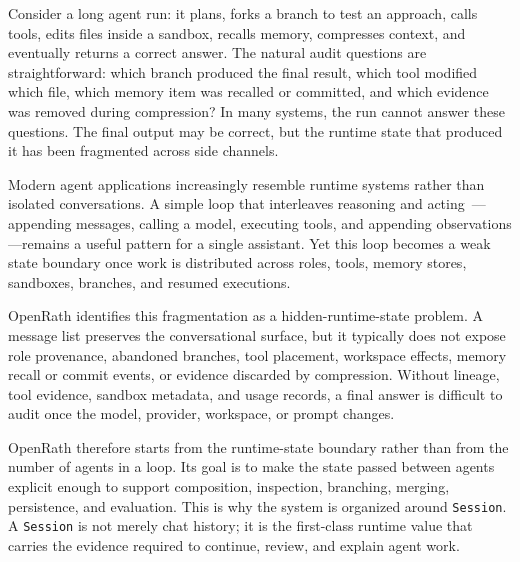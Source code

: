 
Consider a long agent run: it plans, forks a branch to test an approach, calls tools, edits files inside a sandbox, recalls memory, compresses context, and eventually returns a correct answer. The natural audit questions are straightforward: which branch produced the final result, which tool modified which file, which memory item was recalled or committed, and which evidence was removed during compression? In many systems, the run cannot answer these questions. The final output may be correct, but the runtime state that produced it has been fragmented across side channels.

Modern agent applications increasingly resemble runtime systems rather than isolated conversations. A simple loop that interleaves reasoning and acting~\cite{react}---appending messages, calling a model, executing tools, and appending observations---remains a useful pattern for a single assistant. Yet this loop becomes a weak state boundary once work is distributed across roles, tools, memory stores, sandboxes, branches, and resumed executions.

OpenRath identifies this fragmentation as a hidden-runtime-state problem. A message list preserves the conversational surface, but it typically does not expose role provenance, abandoned branches, tool placement, workspace effects, memory recall or commit events, or evidence discarded by compression. Without lineage, tool evidence, sandbox metadata, and usage records, a final answer is difficult to audit once the model, provider, workspace, or prompt changes.

OpenRath therefore starts from the runtime-state boundary rather than from the number of agents in a loop. Its goal is to make the state passed between agents explicit enough to support composition, inspection, branching, merging, persistence, and evaluation. This is why the system is organized around \texttt{Session}. A \texttt{Session} is not merely chat history; it is the first-class runtime value that carries the evidence required to continue, review, and explain agent work.

